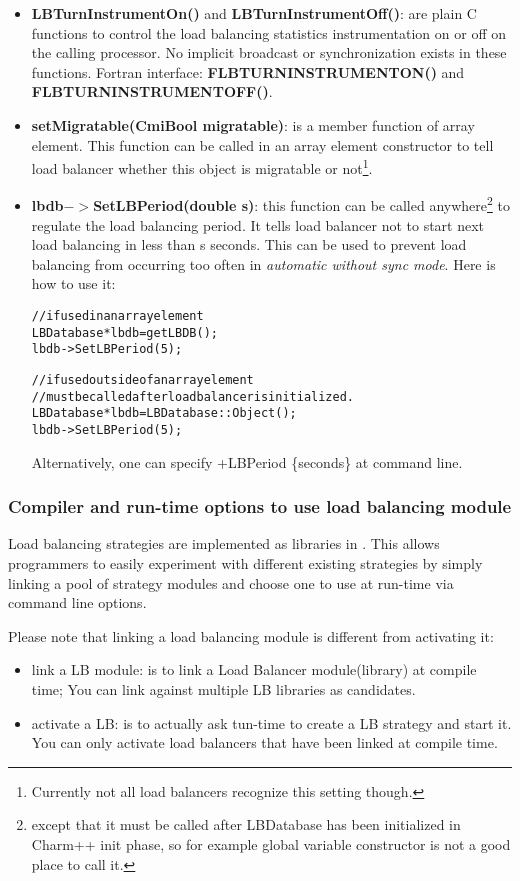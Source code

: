 \begin{itemize}
\item {\bf LBTurnInstrumentOn()} and {\bf LBTurnInstrumentOff()}: are plain C
      functions to control the load balancing statistics instrumentation
      on or off on the calling processor. No implicit broadcast or 
      synchronization exists in these functions.
      Fortran interface: {\bf FLBTURNINSTRUMENTON()} and {\bf FLBTURNINSTRUMENTOFF()}.
\item {\bf setMigratable(CmiBool migratable)}: is a member function of array
      element. This function can be called 
      in an array element constructor to tell load balancer whether this object
      is migratable or not\footnote{Currently not all load balancers 
      recognize this setting though.}.
\item {\bf lbdb$->$SetLBPeriod(double s)}: this function can be called
      anywhere\footnote{except that it must be called after LBDatabase
      has been initialized in Charm++ init phase, so for example global 
      variable constructor is not a good place to call it.} to regulate 
      the load balancing period. It tells load balancer not to start next 
      load balancing in less than s seconds. This can be used to prevent 
      load balancing from occurring too often in 
      {\em automatic without sync mode}. Here is how to use it:
      \begin{alltt}
// if used in an array element
LBDatabase *lbdb = getLBDB();
lbdb->SetLBPeriod(5);

// if used outside of an array element
// must be called after load balancer is initialized.
LBDatabase *lbdb = LBDatabase::Object();
lbdb->SetLBPeriod(5);
\end{alltt}
      Alternatively, one can specify +LBPeriod \{seconds\} at command line.
\end{itemize}

\subsubsection{Compiler and run-time options to use load balancing module}
\label{lbOption}

Load balancing strategies are implemented as libraries in \charmpp{}. This
allows programmers to easily experiment with different existing strategies 
by simply linking a pool of strategy modules and choose 
one to use at run-time via command line options.

Please note that linking a load balancing module is different from activating it:
\begin{itemize}
\item link a LB module: is to link a Load Balancer module(library) at 
   compile time; You can link against multiple LB libraries as candidates.
\item activate a LB: is to actually ask tun-time to create a LB strategy and 
   start it. You can only activate load balancers that have been linked at
   compile time.
\end{itemize}


